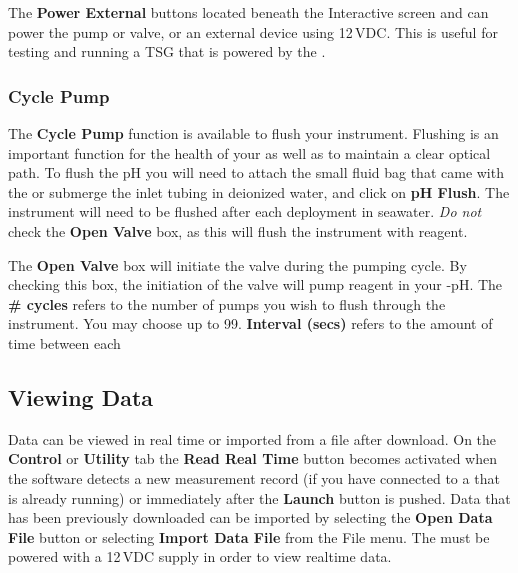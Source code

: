 \or			%

The \textbf{Power External} buttons located beneath the Interactive screen and can power the pump or valve, or an external device using 12\,VDC.  This is useful for testing and running a TSG that is powered by the \instType{}.

\fi


\subsubsection{Cycle Pump}

The \textbf{Cycle Pump} function is available to flush your instrument. Flushing is an important function for the health of your \instType{} as well as to maintain a clear optical path. To flush the pH \instType{} you will need to attach the small fluid bag that came with the \instType{} or submerge the inlet tubing in deionized water, and click on \textbf{pH Flush}. The instrument will need to be flushed after each deployment in seawater.  \textit{Do not} check the \textbf{Open Valve} box, as this will flush the instrument with reagent.

The \textbf{Open Valve} box will initiate the valve during the pumping cycle. By checking this box, the initiation of the valve will pump reagent in your \instType{}-pH. The \textbf{\# cycles} refers to the number of \ifcase {}  \fi pumps you wish to flush through the instrument. You may choose up to 99. \textbf{Interval (secs)} refers to the amount of time between each \ifcase {}  \fi


\subsection{Viewing Data}

\ifcase \inst	%

Data can be viewed in real time or imported from a file after download. On the \textbf{Control} or \textbf{Utility} tab the \textbf{Read Real Time} button becomes activated when the software detects a new measurement record (if you have connected to a \instType{} that is already running) or immediately after the \textbf{Launch} button is pushed. Data that has been previously downloaded can be imported by selecting the \textbf{Open Data File} button or selecting \textbf{Import Data File} from the File menu. The \instType{} must be powered with a 12\,VDC supply in order to view realtime data.

